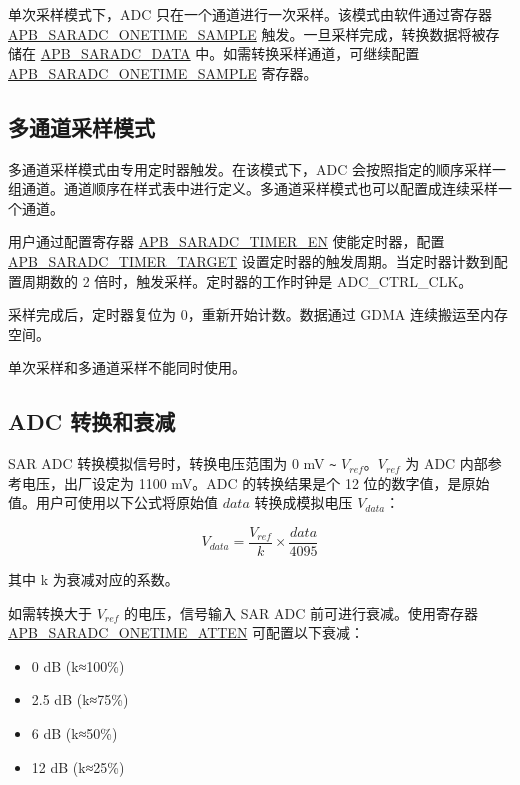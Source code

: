 \documentclass[main\_\_CN.tex]{subfiles}
\begin{document}
单次采样模式下，ADC 只在一个通道进行一次采样。该模式由软件通过寄存器 \hyperref[fielddesc:APBSARADCONETIMESAMPLE]{APB\_SARADC\_ONETIME\_SAMPLE} 触发。一旦采样完成，转换数据将被存储在 \hyperref[fielddesc:APBSARADCDATA]{APB\_SARADC\_DATA} 中。如需转换采样通道，可继续配置 \hyperref[fielddesc:APBSARADCONETIMESAMPLE]{APB\_SARADC\_ONETIME\_SAMPLE} 寄存器。

\subsection{多通道采样模式}
\label{sec:sar-adc-multi-channel-sampling-mode}

多通道采样模式由专用定时器触发。在该模式下，ADC 会按照指定的顺序采样一组通道。通道顺序在样式表中进行定义。多通道采样模式也可以配置成连续采样一个通道。


用户通过配置寄存器 \hyperref[fielddesc:APBSARADCTIMEREN]{APB\_SARADC\_TIMER\_EN} 使能定时器，配置 \hyperref[fielddesc:APBSARADCTIMERTARGET]{APB\_SARADC\_TIMER\_TARGET} 设置定时器的触发周期。当定时器计数到配置周期数的 2 倍时，触发采样。定时器的工作时钟是 ADC\_CTRL\_CLK。

采样完成后，定时器复位为 0，重新开始计数。数据通过 GDMA 连续搬运至内存空间。

\begin{tiplisting}
单次采样和多通道采样不能同时使用。
\end{tiplisting}

\subsection{ADC 转换和衰减}
\label{sec:sar-adc-conversion-and attenuation}

SAR ADC 转换模拟信号时，转换电压范围为 0 mV \verb+~+ \(V_{ref}\)。\(V_{ref}\) 为 ADC 内部参考电压，出厂设定为 1100 mV。ADC 的转换结果是个 12 位的数字值，是原始值。用户可使用以下公式将原始值 \(data\) 转换成模拟电压 \(V_{data}\)：

    \[
    V_{data} = \frac{V_{ref}}{k}\times{\frac{data}{4095}}
    \]

其中 k 为衰减对应的系数。

如需转换大于 \(V_{ref}\) 的电压，信号输入 SAR ADC 前可进行衰减。使用寄存器 \hyperref[fielddesc:APBSARADCONETIMEATTEN]{APB\_SARADC\_ONETIME\_ATTEN} 可配置以下衰减：

\begin{itemize}
    \item 0 dB (k≈100\%)
    \item 2.5 dB (k≈75\%)
    \item 6 dB (k≈50\%)
    \item 12 dB (k≈25\%)
\end{itemize}
\end{document}
